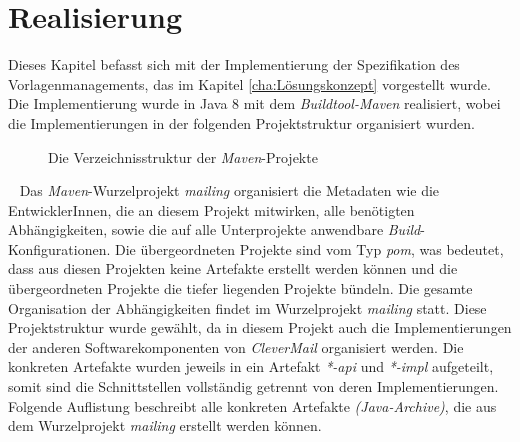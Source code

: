 \chapter{Realisierung}
\label{cha:Realisierung}
Dieses Kapitel befasst sich mit der Implementierung der Spezifikation des Vorlagenmanagements, das im Kapitel \ref{cha:Lösungskonzept} vorgestellt wurde. Die Implementierung wurde in Java 8 mit dem \emph{Buildtool-Maven} realisiert, wobei die Implementierungen in der folgenden Projektstruktur organisiert wurden.
\begin{figure}[h]
\caption{Die Verzeichnisstruktur der \emph{Maven}-Projekte}
\label{fig:minimal-example:frame-dirtree}
\end{figure}
\ \newline
Das \emph{Maven}-Wurzelprojekt \emph{mailing} organisiert die Metadaten wie die EntwicklerInnen, die an diesem Projekt mitwirken, alle benötigten Abhängigkeiten, sowie die auf alle Unterprojekte anwendbare \emph{Build}-Konfigurationen. Die übergeordneten Projekte sind vom Typ \emph{pom}, was bedeutet, dass aus diesen Projekten keine Artefakte erstellt werden können und die übergeordneten Projekte die tiefer liegenden Projekte bündeln. Die gesamte Organisation der Abhängigkeiten findet im Wurzelprojekt \emph{mailing} statt. Diese Projektstruktur wurde gewählt, da in diesem Projekt auch die Implementierungen der anderen Softwarekomponenten von \emph{CleverMail} organisiert werden. Die konkreten Artefakte wurden jeweils in ein Artefakt \emph{*-api} und \emph{*-impl} aufgeteilt, somit sind die Schnittstellen  vollständig getrennt von deren Implementierungen. Folgende Auflistung beschreibt alle konkreten Artefakte \emph{(Java-Archive)}, die aus dem Wurzelprojekt \emph{mailing} erstellt werden können.
